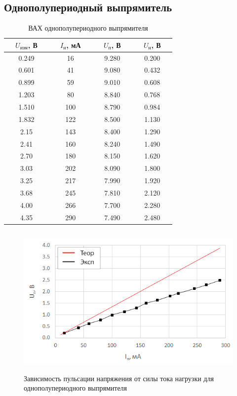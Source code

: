 \subsection{Однополупериодный выпрямитель}

\begin{table}[H]
	\begin{center}
	\caption{ВАХ однополупериодного выпрямителя}
	\def\arraystretch{1.25}
		\begin{tabular}{|c|c|c|c|}
		\hline 
		\ \ $U_\text{изм}$, В\ \  & \ \ $I_\text{н}$, мА\ \  & \ \ $U_\text{п}$, В\ \  & \ \ $U_\text{н}$, В\ \  \\ \hline
		0.249 & 16 & 9.280 & 0.200 \\ \hline
		0.601 & 41 & 9.080 & 0.432 \\ \hline
		0.899 & 59 & 9.010 & 0.608 \\ \hline
		1.203 & 80 & 8.840 & 0.768 \\ \hline
		1.510 & 100 & 8.790 & 0.984 \\ \hline
		1.832 & 122 & 8.500 & 1.130 \\ \hline
		2.15 & 143 & 8.400 & 1.290 \\ \hline
		2.41 & 160 & 8.240 & 1.490 \\ \hline
		2.70 & 180 & 8.150 & 1.620 \\ \hline
		3.03 & 202 & 8.090 & 1.800 \\ \hline
		3.25 & 217 & 7.990 & 1.920 \\ \hline
		3.68 & 245 & 7.810 & 2.120 \\ \hline
		4.00 & 266 & 7.700 & 2.280 \\ \hline
		4.35 & 290 & 7.490 & 2.480 \\ \hline
		\end{tabular} 
		\label{tab:5:2}
	\end{center}
\end{table}

\begin{figure}[H]
	\begin{center}
		\includegraphics[height=7.5cm]{img/2}
		\caption{Зависимость пульсации напряжения от силы тока нагрузки для однополупериодного выпрямителя}
		\label{g:2} %
	\end{center}
\end{figure}

